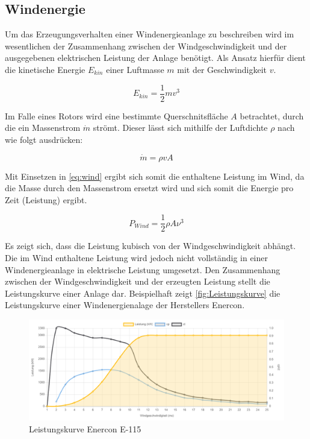 \subsection{Windenergie}


Um das Erzeugungsverhalten einer Windenergieanlage zu beschreiben wird im wesentlichen der Zusammenhang zwischen der Windgeschwindigkeit und der ausgegebenen elektrischen Leistung der Anlage benötigt. Als Ansatz hierfür dient die kinetische Energie $E_{kin}$ einer Luftmasse $m$ mit der Geschwindigkeit $v$. \cite{Hau2016}

\begin{equation}
	E_{kin} = \frac{1}{2} mv^3
	\label{eq:wind}
\end{equation}

Im Falle eines Rotors wird eine bestimmte Querschnitsfläche $A$ betrachtet, durch die ein Massenstrom $\dot{m}$ strömt. Dieser lässt sich mithilfe der Luftdichte $\rho$ nach \cite{} wie folgt ausdrücken:

\begin{equation}
	\dot{m} = \rho vA
\end{equation}

Mit Einsetzen in \autoref{eq:wind} ergibt sich somit die enthaltene Leistung im Wind, da die Masse durch den Massenstrom ersetzt wird und sich somit die Energie pro Zeit (Leistung) ergibt.

\begin{equation}
	P_{Wind} = \frac{1}{2}\rho A \nu^3
\end{equation}

Es zeigt sich, dass die Leistung kubisch von der Windgeschwindigkeit abhängt. Die im Wind enthaltene Leistung wird jedoch nicht vollständig in einer Windenergieanlage in elektrische Leistung umgesetzt. Den Zusammenhang zwischen der Windgeschwindigkeit und der erzeugten Leistung stellt die Leistungskurve einer Anlage dar. Beispielhaft zeigt \autoref{fig:Leistungskurve} die Leistungskurve einer Windenergienalage der Herstellers Enercon. 

\begin{figure}[H]
	\centering
	\includegraphics[width=0.9\linewidth]{Abbildungen/Enercon E115.png}
	\caption{Leistungskurve Enercon E-115 \cite{E115}}
	\label{fig:Leistungskurve}
\end{figure}


